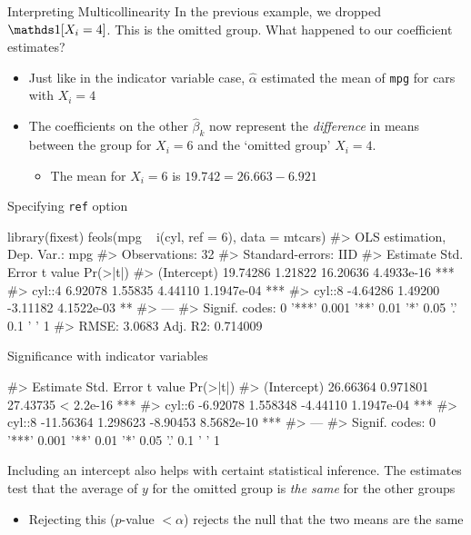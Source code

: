 \documentclass[aspectratio=169,t,11pt,table]{beamer}
\begin{document}
\begin{frame}{Interpreting Multicollinearity}
  In the previous example, we dropped $\one{X_i = 4}$. This is the \alert{omitted group}. What happened to our coefficient estimates?

  \bigskip
  \begin{itemize}
    \item Just like in the indicator variable case, $\hat{\alpha}$ estimated the mean of \texttt{mpg} for cars with $X_i = 4$
    
    \pause
    \item The coefficients on the other $\hat{\beta}_k$ now represent the \emph{difference} in means between the group for $X_i = 6$ and the `omitted group' $X_i = 4$. 
    \begin{itemize}
      \item The mean for $X_i = 6$ is $19.742 = 26.663 - 6.921$
    \end{itemize}
  \end{itemize}
\end{frame}

\begin{frame}[fragile]{Specifying \texttt{ref} option}
  \vspace*{-1.25\bigskipamount}
  \begin{codeblock}
library(fixest)
feols(mpg ~ i(cyl, ref = 6), data = mtcars)
#> OLS estimation, Dep. Var.: mpg
#> Observations: 32
#> Standard-errors: IID 
#>             Estimate Std. Error  t value   Pr(>|t|)    
#> (Intercept) 19.74286    1.21822 16.20636 4.4933e-16 ***
#> cyl::4       6.92078    1.55835  4.44110 1.1947e-04 ***
#> cyl::8      -4.64286    1.49200 -3.11182 4.1522e-03 ** 
#> ---
#> Signif. codes:  0 '***' 0.001 '**' 0.01 '*' 0.05 '.' 0.1 ' ' 1
#> RMSE: 3.0683   Adj. R2: 0.714009
  \end{codeblock}
\end{frame}

\begin{frame}[fragile]{Significance with indicator variables}
  \vspace*{-1.25\bigskipamount}
  \begin{codeblock}
#>              Estimate Std. Error  t value   Pr(>|t|)    
#> (Intercept)  26.66364   0.971801 27.43735  < 2.2e-16 ***
#> cyl::6       -6.92078   1.558348 -4.44110 1.1947e-04 ***
#> cyl::8      -11.56364   1.298623 -8.90453 8.5682e-10 ***
#> ---
#> Signif. codes:  0 '***' 0.001 '**' 0.01 '*' 0.05 '.' 0.1 ' ' 1
  \end{codeblock}
  
  Including an intercept also helps with certaint statistical inference.
  The estimates test that the average of $y$ for the omitted group is \emph{the same} for the other groups
  \begin{itemize}
    \item Rejecting this ($p$-value $< \alpha$) rejects the null that the two means are the same
  \end{itemize}
\end{frame}
\end{document}
